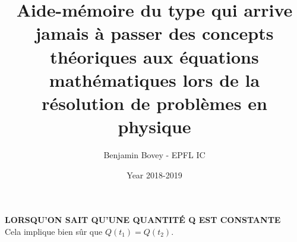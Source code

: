 \documentclass{article}
\title{Aide-mémoire du type qui arrive jamais à passer des concepts théoriques aux équations mathématiques lors de la résolution de problèmes en physique}
\author{Benjamin Bovey - EPFL IC}
\date{Year 2018-2019}
\begin{document}
\maketitle

\textbf{LORSQU'ON SAIT QU'UNE QUANTITÉ Q EST CONSTANTE} \\
Cela implique bien sûr que \(\boxed{Q(t_1) = Q(t_2)}\).
\end{document}
